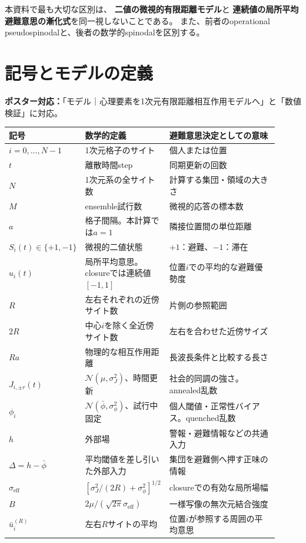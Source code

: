 \documentclass[a4paper,12pt]{ltjsarticle}
\newcommand{\PosterMap}[1]{%
  \begin{tcolorbox}[enhanced,boxrule=0pt,arc=1mm,colback=softgray,
    left=2mm,right=2mm,top=1mm,bottom=1mm,before skip=0pt,after skip=0.7em]
  \normalsize\textbf{ポスター対応：}#1
  \end{tcolorbox}}
\newcommand{\KeyPoint}[1]{%
  \begin{tcolorbox}[enhanced,breakable,colback=softorange,colframe=orange,
    boxrule=0.7pt,arc=1.2mm,left=3mm,right=3mm,top=2mm,bottom=2mm]
  #1
  \end{tcolorbox}}
\begin{document}
\KeyPoint{
  本資料で最も大切な区別は、
  \textbf{二値の微視的有限距離モデル}と
  \textbf{連続値の局所平均避難意思の漸化式}を同一視しないことである。
  また、前者のoperational pseudospinodalと、後者の数学的spinodalを区別する。
}

\section{記号とモデルの定義}\label{sec:symbols}
\PosterMap{「モデル｜心理要素を1次元有限距離相互作用モデルへ」と「数値検証」に対応。}

\begin{longtable}{>{\centering\arraybackslash}p{0.16\linewidth}p{0.29\linewidth}p{0.46\linewidth}}
\toprule
記号 & 数学的定義 & 避難意思決定としての意味 \\
\midrule
\endhead
$i=0,\ldots,N-1$ & 1次元格子のサイト & 個人または位置 \\
$t$ & 離散時間step & 同期更新の回数 \\
$N$ & 1次元系の全サイト数 & 計算する集団・領域の大きさ \\
$M$ & ensemble試行数 & 微視的応答の標本数 \\
$a$ & 格子間隔。本計算では$a=1$ & 隣接位置間の単位距離 \\
$S_i(t)\in\{+1,-1\}$ & 微視的二値状態 & $+1$：避難、$-1$：滞在 \\
$u_i(t)$ & 局所平均意思。closureでは連続値 $[-1,1]$ & 位置$i$での平均的な避難優勢度 \\
$R$ & 左右それぞれの近傍サイト数 & 片側の参照範囲 \\
$2R$ & 中心$i$を除く全近傍サイト数 & 左右を合わせた近傍サイズ \\
$Ra$ & 物理的な相互作用距離 & 長波長条件と比較する長さ \\
$J_{i,\pm r}(t)$ & $\mathcal N(\mu,\sigma_J^2)$、時間更新 & 社会的同調の強さ。annealed乱数 \\
$\phi_i$ & $\mathcal N(\bar\phi,\sigma_\phi^2)$、試行中固定 & 個人閾値・正常性バイアス。quenched乱数 \\
$h$ & 外部場 & 警報・避難情報などの共通入力 \\
$\Delta=h-\bar\phi$ & 平均閾値を差し引いた外部入力 & 集団を避難側へ押す正味の情報 \\
$\sigma_{\mathrm{eff}}$ & $[\sigma_J^2/(2R)+\sigma_\phi^2]^{1/2}$ & closureでの有効な局所場幅 \\
$B$ & $2\mu/(\sqrt{2\pi}\sigma_{\mathrm{eff}})$ & 一様写像の無次元結合強度 \\
$\bar u_i^{(R)}$ & 左右$R$サイトの平均 & 位置$i$が参照する周囲の平均意思 \\

\end{longtable}
\end{document}
